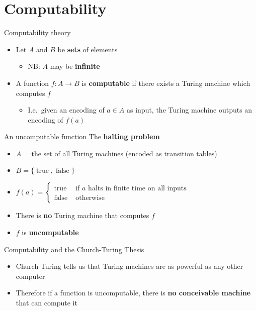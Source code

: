 \part{Computability}
\frame{\partpage}

\begin{frame}{Computability theory}
	\begin{itemize}
		\pause\item Let $A$ and $B$ be \textbf{sets} of elements
			\begin{itemize}
				\pause\item NB: $A$ may be \textbf{infinite}
			\end{itemize}
		\pause\item A function $f : A \to B$ is \textbf{computable} if there exists a Turing machine
			which computes $f$
			\begin{itemize}
				\pause\item I.e.\ given an encoding of $a \in A$ as input, the Turing machine outputs an encoding of
					$f(a)$
			\end{itemize}
	\end{itemize}
\end{frame}

\begin{frame}{An uncomputable function}
	The \textbf{halting problem}
	\begin{itemize}
		\pause\item $A$ = the set of all Turing machines (encoded as transition tables)
		\pause\item $B = \{ \operatorname{true}, \operatorname{false} \}$
		\pause\item $f(a) = \begin{cases}
			\operatorname{true} & \text{ if $a$ halts in finite time on all inputs} \\
			\operatorname{false} & \text{ otherwise}
		\end{cases}$
		\pause\item There is \textbf{no} Turing machine that computes $f$
		\pause\item $f$ is \textbf{uncomputable}
	\end{itemize}
\end{frame}

\begin{frame}{Computability and the Church-Turing Thesis}
	\begin{itemize}
		\pause\item Church-Turing tells us that Turing machines are as powerful as any other computer
		\pause\item Therefore if a function is uncomputable, there is \textbf{no conceivable machine} that can compute it
	\end{itemize}
\end{frame}

